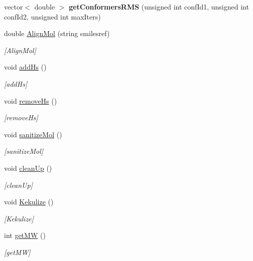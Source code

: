 \begin{DoxyCompactItemize}
\mbox{\label{class_molecule_a98b0a89a7c6275eee5252155fa530e77}} 
vector$<$ double $>$ {\bfseries get\+Conformers\+R\+MS} (unsigned int conf\+Id1, unsigned int conf\+Id2, unsigned int max\+Iters)
\item 
double \mbox{\hyperlink{class_molecule_a8c47d44f8436cb7d3741af6aeb734a37}{Align\+Mol}} (string smilesref)
\begin{DoxyCompactList}\small\item\em \mbox{[}Align\+Mol\mbox{]} \end{DoxyCompactList}\item 
void \mbox{\hyperlink{class_molecule_a4113a3e70e7bc6d994bf7c8f14d94c9b}{add\+Hs}} ()
\begin{DoxyCompactList}\small\item\em \mbox{[}add\+Hs\mbox{]} \end{DoxyCompactList}\item 
void \mbox{\hyperlink{class_molecule_aff4e7702feb85eb5d43b5ae89a504ca3}{remove\+Hs}} ()
\begin{DoxyCompactList}\small\item\em \mbox{[}remove\+Hs\mbox{]} \end{DoxyCompactList}\item 
void \mbox{\hyperlink{class_molecule_a1d3b07d426af616e861606727848d35e}{sanitize\+Mol}} ()
\begin{DoxyCompactList}\small\item\em \mbox{[}sanitize\+Mol\mbox{]} \end{DoxyCompactList}\item 
void \mbox{\hyperlink{class_molecule_ae9aeca03c03bbd36ab63c4a69e2ddc82}{clean\+Up}} ()
\begin{DoxyCompactList}\small\item\em \mbox{[}clean\+Up\mbox{]} \end{DoxyCompactList}\item 
void \mbox{\hyperlink{class_molecule_ac70bc19bc462d250f2c4de320bd3330c}{Kekulize}} ()
\begin{DoxyCompactList}\small\item\em \mbox{[}Kekulize\mbox{]} \end{DoxyCompactList}\item 
int \mbox{\hyperlink{class_molecule_afa532b75ee416a58bf7f628252522e65}{get\+MW}} ()
\begin{DoxyCompactList}\small\item\em \mbox{[}get\+MW\mbox{]} \end{DoxyCompactList}\item 

\end{DoxyCompactItemize}
